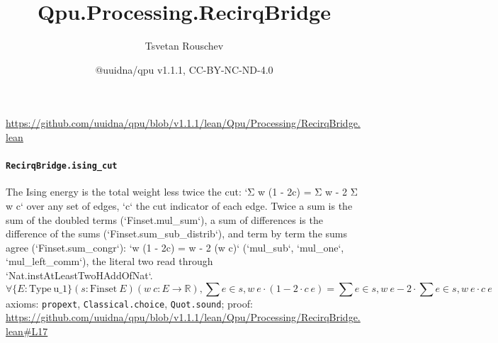 \documentclass[11pt]{article}
\title{Qpu.Processing.RecirqBridge}
\author{Tsvetan Rouschev}
\date{@uuidna/qpu v1.1.1, CC-BY-NC-ND-4.0}
\begin{document}
\maketitle
\noindent\url{https://github.com/uuidna/qpu/blob/v1.1.1/lean/Qpu/Processing/RecirqBridge.lean}

\paragraph{\texttt{RecirqBridge.ising\_cut}}
The Ising energy is the total weight less twice the cut: `Σ w (1 - 2c) = Σ w - 2 Σ w c` over any set of edges, `c` the cut indicator of each edge. Twice a sum is the sum of the doubled terms (`Finset.mul\_sum`), a sum of differences is the difference of the sums (`Finset.sum\_sub\_distrib`), and term by term the sums agree (`Finset.sum\_congr`): `w (1 - 2c) = w - 2 (w c)` (`mul\_sub`, `mul\_one`, `mul\_left\_comm`), the literal two read through `Nat.instAtLeastTwoHAddOfNat`.
\[ \forall \{E : \mathrm{Type}\ \mathrm{u\_1}\} (s : \mathrm{Finset}\ E) (w\ c : E \to \mathbb{R}), \sum e \in s, w\ e \cdot (1 - 2 \cdot c\ e) = \sum e \in s, w\ e - 2 \cdot \sum e \in s, w\ e \cdot c\ e \]
\noindent axioms: \texttt{propext}, \texttt{Classical.choice}, \texttt{Quot.sound}; proof: \url{https://github.com/uuidna/qpu/blob/v1.1.1/lean/Qpu/Processing/RecirqBridge.lean\#L17}
\end{document}
